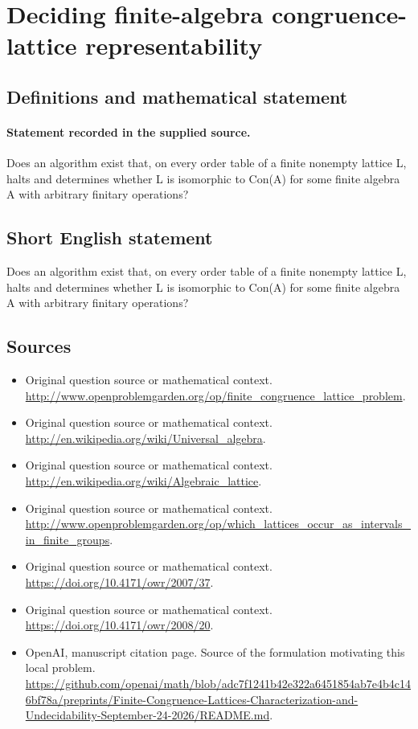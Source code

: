 \documentclass[11pt]{article}
\begin{document}
\section*{Deciding finite-algebra congruence-lattice representability}\label{30006994}
\subsection{Definitions and mathematical statement}
\paragraph{Statement recorded in the supplied source.}
Does an algorithm exist that, on every order table of a finite nonempty lattice L, halts and determines whether L is isomorphic to Con(A) for some finite algebra A with arbitrary finitary operations?
\subsection{Short English statement}
Does an algorithm exist that, on every order table of a finite nonempty lattice L, halts and determines whether L is isomorphic to Con(A) for some finite algebra A with arbitrary finitary operations?
\subsection{Sources}
\begin{itemize}
\item[S1] Original question source or mathematical context.
\url{http://www.openproblemgarden.org/op/finite_congruence_lattice_problem}.
\item[S2] Original question source or mathematical context.
\url{http://en.wikipedia.org/wiki/Universal_algebra}.
\item[S3] Original question source or mathematical context.
\url{http://en.wikipedia.org/wiki/Algebraic_lattice}.
\item[S4] Original question source or mathematical context.
\url{http://www.openproblemgarden.org/op/which_lattices_occur_as_intervals_in_finite_groups}.
\item[S5] Original question source or mathematical context.
\url{https://doi.org/10.4171/owr/2007/37}.
\item[S6] Original question source or mathematical context.
\url{https://doi.org/10.4171/owr/2008/20}.
\item[S7] OpenAI, manuscript citation page. Source of the formulation motivating this local problem.
\url{https://github.com/openai/math/blob/adc7f1241b42e322a6451854ab7e4b4c146bf78a/preprints/Finite-Congruence-Lattices-Characterization-and-Undecidability-September-24-2026/README.md}.
\end{itemize}
\end{document}
